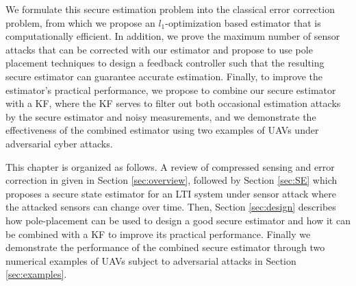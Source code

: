 \documentclass[../../thesis.tex]{subfiles}
\begin{document}
We formulate this secure estimation problem into the classical error correction problem, from which we propose an $l_1$-optimization based estimator that is computationally efficient.
In addition, we prove the maximum number of sensor attacks that can be corrected with our estimator and propose to use pole placement techniques to design a feedback controller such that the resulting secure estimator can guarantee accurate estimation.
Finally, to improve the estimator's practical performance, we propose to combine our secure estimator with a KF, where the KF serves to filter out both occasional estimation attacks by the secure estimator and noisy measurements, and we demonstrate the effectiveness of the combined estimator using two examples of UAVs under adversarial cyber attacks.





This chapter is organized as follows. A review of compressed sensing and error correction in given in Section \ref{sec:overview}, followed by Section \ref{sec:SE} which proposes a secure state estimator for an LTI system under sensor attack where the attacked sensors can change over time. 
Then, Section \ref{sec:design} describes how pole-placement can be used to design a good secure estimator and how it can be combined with a KF to improve its practical performance. 
Finally we demonstrate the performance of the combined secure estimator through two numerical examples of UAVs subject to adversarial attacks in Section \ref{sec:examples}. 
\end{document}

